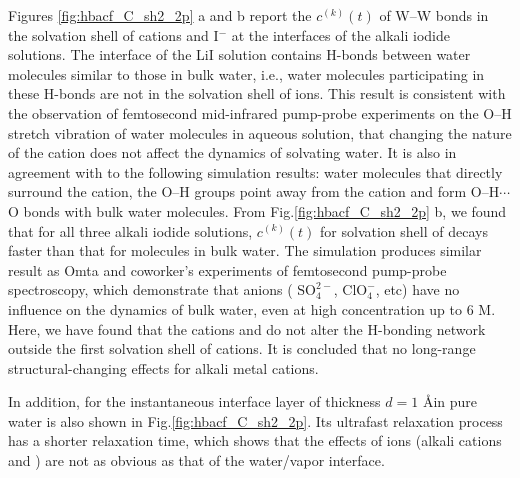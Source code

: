 Figures \thinspace\ref{fig:hbacf_C_sh2_2p} a and b 
report the  $c^{(k)}(t)$ of W--W bonds in the solvation shell of cations and I$^-$ at the interfaces of the alkali iodide solutions.
The interface of the LiI solution contains H-bonds between water molecules similar to those in bulk water, i.e.,
water molecules participating in these H-bonds are not in the solvation shell of ions. 
This result is consistent with the observation of femtosecond mid-infrared pump-probe experiments 
on the O--H stretch vibration of water molecules in aqueous solution,
that changing the nature of the cation does not affect the dynamics of solvating water\cite{Kropman2001}.
It is also in agreement with to the following \abinitio simulation results: water molecules that directly surround the cation, the O--H groups point
away from the cation and form O--H$\cdots$O bonds with bulk water molecules\cite{Hashimoto1994,Ramaniah1998,Kropman2001}.
From Fig.\thinspace\ref{fig:hbacf_C_sh2_2p} b, we found that for all three alkali iodide solutions, $c^{(k)}(t)$ for solvation shell  
of \I decays faster than that for molecules in bulk water.
The simulation produces similar result as Omta and coworker's experiments of femtosecond pump-probe spectroscopy,
which demonstrate that anions ( $\text{SO}^{2-}_4$, $\text{ClO}^-_4$, etc) have no influence on the dynamics of bulk water, 
even at high concentration up to 6 M\cite{Omta2003, ZhangYanjie2006}. 
Here, we have found that the cations \Li and \Na do not alter the H-bonding network outside the first solvation shell of cations. 
It is concluded that no long-range structural-changing effects for alkali metal cations.

In addition, \CHB for the instantaneous interface layer of thickness $d=1$ \AA in pure water is also shown in Fig.\thinspace\ref{fig:hbacf_C_sh2_2p}.
Its ultrafast relaxation process has a shorter relaxation time, which shows that the effects of ions (alkali cations and \I) are not as obvious as that of the water/vapor interface.


